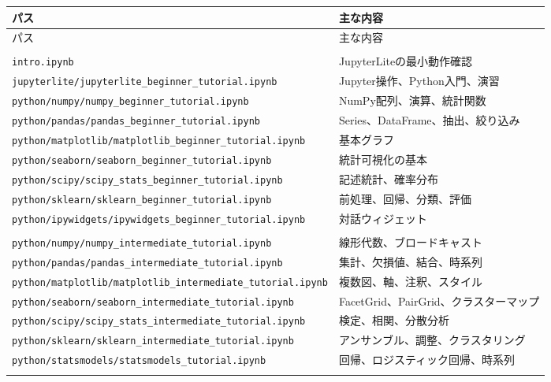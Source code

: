\documentclass[a4paper,11pt]{ltjsarticle}
\newcommand{\filepath}[1]{\nolinkurl{#1}}
\begin{document}
\small
\begin{longtable}{>{\raggedright\arraybackslash}p{}
                  >{\raggedright\arraybackslash}p{}}
\toprule
パス & 主な内容\\
\midrule
\endfirsthead
\toprule
パス & 主な内容\\
\midrule
\endhead
\multicolumn{2}{l}{\bfseries 入門・基礎}\\
\filepath{intro.ipynb} & JupyterLiteの最小動作確認\\
\filepath{jupyterlite/jupyterlite_beginner_tutorial.ipynb}
  & Jupyter操作、Python入門、演習\\
\filepath{python/numpy/numpy_beginner_tutorial.ipynb} & NumPy配列、演算、統計関数\\
\filepath{python/pandas/pandas_beginner_tutorial.ipynb} & Series、DataFrame、抽出、絞り込み\\
\filepath{python/matplotlib/matplotlib_beginner_tutorial.ipynb} & 基本グラフ\\
\filepath{python/seaborn/seaborn_beginner_tutorial.ipynb} & 統計可視化の基本\\
\filepath{python/scipy/scipy_stats_beginner_tutorial.ipynb} & 記述統計、確率分布\\
\filepath{python/sklearn/sklearn_beginner_tutorial.ipynb} & 前処理、回帰、分類、評価\\
\filepath{python/ipywidgets/ipywidgets_beginner_tutorial.ipynb} & 対話ウィジェット\\
\midrule
\multicolumn{2}{l}{\bfseries 中級・発展}\\
\filepath{python/numpy/numpy_intermediate_tutorial.ipynb} & 線形代数、ブロードキャスト\\
\filepath{python/pandas/pandas_intermediate_tutorial.ipynb} & 集計、欠損値、結合、時系列\\
\filepath{python/matplotlib/matplotlib_intermediate_tutorial.ipynb} & 複数図、軸、注釈、スタイル\\
\filepath{python/seaborn/seaborn_intermediate_tutorial.ipynb} & FacetGrid、PairGrid、クラスターマップ\\
\filepath{python/scipy/scipy_stats_intermediate_tutorial.ipynb} & 検定、相関、分散分析\\
\filepath{python/sklearn/sklearn_intermediate_tutorial.ipynb} & アンサンブル、調整、クラスタリング\\
\filepath{python/statsmodels/statsmodels_tutorial.ipynb}
  & 回帰、ロジスティック回帰、時系列\\
\midrule
\multicolumn{2}{l}{\bfseries 総合版・特殊トピック}\\

\end{longtable}
\end{document}
